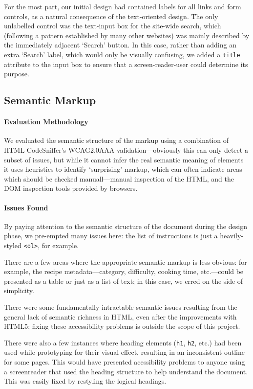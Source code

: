 For the most part, our initial design had contained labels for all
links and form controls, as a natural consequence of the text-oriented
design. The only unlabelled control was the text-input box for the
site-wide search, which (following a pattern established by many other
websites) was mainly described by the immediately adjacent `Search'
button. In this case, rather than adding an extra `Search' label,
which would only be visually confusing, we added a \verb!title!
attribute to the input box to ensure that a screen-reader-user could
determine its purpose.

\subsection{Semantic Markup}

\paragraph{Evaluation Methodology}
We evaluated the semantic structure of the markup using a combination
of HTML CodeSniffer's WCAG2.0AAA validation---obviously this can only
detect a subset of issues, but while it cannot infer the real semantic
meaning of elements it uses heuristics to identify `surprising'
markup, which can often indicate areas which should be checked
manuall---manual inspection of the HTML, and the DOM inspection tools
provided by browsers.

\paragraph{Issues Found}
By paying attention to the semantic structure of the document during
the design phase, we pre-empted many issues here: the list of
instructions is just a heavily-styled \verb!<ol>!, for example.

There are a few areas where the appropriate semantic markup is less
obvious: for example, the recipe metadata---category, difficulty,
cooking time, etc.---could be presented as a table or just as a list
of text; in this case, we erred on the side of simplicity.

There were some fundamentally intractable semantic issues resulting
from the general lack of semantic richness in HTML, even after the
improvements with HTML5; fixing these accessibility problems is
outside the scope of this project.

There were also a few instances where heading elements (\verb!h1!,
\verb!h2!, etc.) had been used while prototyping for their visual
effect, resulting in an inconsistent outline for some pages. This
would have presented acessibility problems to anyone using a
screenreader that used the heading structure to help understand the
document. This was easily fixed by restyling the logical headings.

